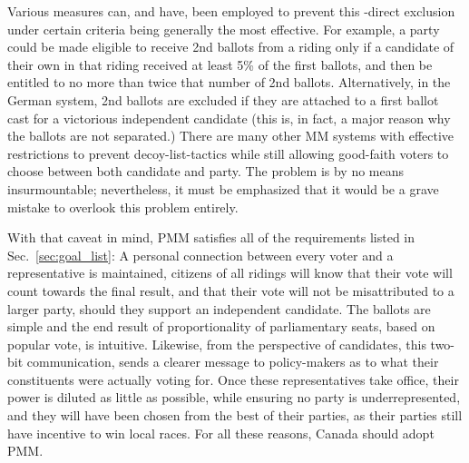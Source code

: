 Various measures can, and have, been employed to prevent this \--direct exclusion under certain criteria being generally the most effective.
For example, a party could be made eligible to receive 2nd ballots from a riding only if a candidate of their own in that riding received at least 5\% of the first ballots, and then be entitled to no more than twice that number of 2nd ballots. 
Alternatively, in the German system, 2nd ballots are excluded if they are attached to a first ballot cast for a victorious independent candidate (this is, in fact, a major reason why the ballots are not separated.) 
There are many other MM systems with effective restrictions to prevent decoy-list-tactics while still allowing good-faith voters to choose between both candidate and party. The problem is by no means insurmountable; nevertheless, it must be emphasized that it would be a grave mistake to overlook this problem entirely.

With that caveat in mind, PMM satisfies all of the requirements listed in Sec.~\ref{sec:goal_list}: A personal connection between every voter and a representative is maintained, citizens of all ridings will know that their vote will count towards the final result, and that their vote will not be misattributed to a larger party, should they support an independent candidate. 
The ballots are simple and the end result of proportionality of parliamentary seats, based on popular vote, is intuitive.
Likewise, from the perspective of candidates, this two-bit communication, sends a clearer message to policy-makers as to what their constituents were actually voting for. 
Once these representatives take office, their power is diluted as little as possible, while ensuring no party is underrepresented, and they will have been chosen from the best of their parties, as their parties still have incentive to win local races. 
For all these reasons, Canada should adopt PMM. 

